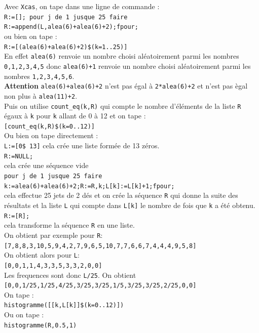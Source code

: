 \documentclass[a4paper,11pt]{book}
\begin{document}
Avec {\tt Xcas}, on tape dans une ligne de commande :\\
{\tt R:=[]; pour j de 1 jusque 25 faire R:=append(L,alea(6)+alea(6)+2);fpour;}\\
ou bien on tape :\\
{\tt R:=[(alea(6)+alea(6)+2)\$(k=1..25)]}\\
En effet {\tt alea(6)} renvoie  un nombre choisi al\'eatoirement parmi
les nombres {\tt 0,1,2,3,4,5} donc {\tt alea(6)+1} renvoie
 un nombre choisi al\'eatoirement parmi les nombres {\tt 1,2,3,4,5,6}.\\ 
{\bf Attention} {\tt alea(6)+alea(6)+2} n'est pas \'egal \`a {\tt 2*alea(6)+2} 
et n'est pas \`egal non plus \`a {\tt alea(11)+2}.\\
Puis on utilise {\tt count\_eq(k,R)} qui compte le nombre d'\'el\'ements de la 
liste {\tt R} égaux à {\tt k} pour {\tt k} allant de 0 \`a 12 et on tape :\\
{\tt [count\_eq(k,R)\$(k=0..12)]}\\
Ou bien on tape directement :\\
{\tt L:=[0\$ 13]}
cela cr\'ee une liste form\'ee de 13 z\'eros.\\
{\tt R:=NULL;}\\
cela cr\'ee une s\'equence vide\\
{\tt pour j de 1 jusque 25 faire k:=alea(6)+alea(6)+2;R:=R,k;L[k]:=L[k]+1;fpour;}\\ 
cela effectue 25 jets de 2 d\'es et on cr\'ee la s\'equence {\tt R} qui donne 
la suite des r\'esultats et la liste {\tt L} qui compte dans {\tt L[k]} le 
nombre de fois que {\tt k} a \'et\'e obtenu.\\
{\tt R:=[R];}\\
cela transforme la s\'equence  {\tt R} en une liste.\\
On obtient par exemple pour {\tt R}:\\ 
{\tt [7,8,8,3,10,5,9,4,2,7,9,6,5,10,7,7,6,6,7,4,4,4,9,5,8]}\\
On obtient alors pour {\tt L}:\\ 
{\tt [0,0,1,1,4,3,3,5,3,3,2,0,0]}\\
Les frequences sont donc {\tt L/25}. 
On obtient \\
{\tt [0,0,1/25,1/25,4/25,3/25,3/25,1/5,3/25,3/25,2/25,0,0]}\\
On tape :\\
{\tt histogramme([[k,L[k]]\$(k=0..12)])}\\
Ou on tape :\\
{\tt histogramme(R,0.5,1)}
\end{document}
